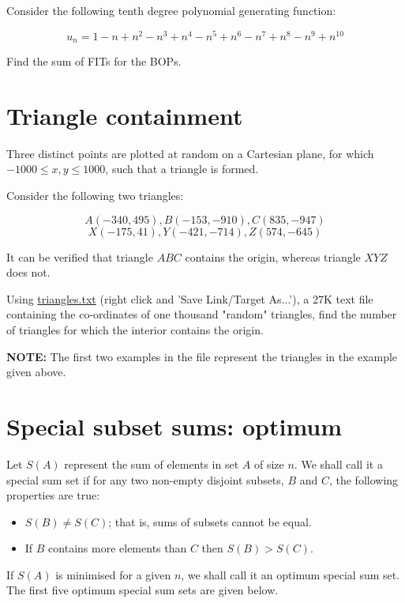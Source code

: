Consider the following tenth degree polynomial generating function:

$$u_n = 1 - n + n^2 - n^3 + n^4 - n^5 + n^6 - n^7 + n^8 - n^9 + n^{10}$$

Find the sum of FITs for the BOPs.


\section{Triangle containment} \label{pb.0102}

Three distinct points are plotted at random on a Cartesian plane, for which $-1000 \leqslant x, y \leqslant 1000$, such that a triangle is formed.

Consider the following two triangles:

$$A(-340,495), B(-153,-910), C(835,-947)$$
$$X(-175,41), Y(-421,-714), Z(574,-645)$$

It can be verified that triangle $ABC$ contains the origin, whereas triangle $XYZ$ does not.
\smallskip

Using \href{https://projecteuler.net/project/resources/p102_triangles.txt}{triangles.txt} (right click and 'Save Link/Target As...'), a 27K text file containing the co-ordinates of one thousand "random" triangles, find the number of triangles for which the interior contains the origin.
\smallskip

\textbf{NOTE:} The first two examples in the file represent the triangles in the example given above.

\newpage


\section{Special subset sums: optimum} \label{pb.0103}

Let $S(A)$ represent the sum of elements in set $A$ of size $n$. We shall call it a special sum set if for any two non-empty disjoint subsets, $B$ and $C$, the following properties are true:
\medskip

\begin{itemize}
    \item $S(B) \neq S(C)$; that is, sums of subsets cannot be equal.
    \item If $B$ contains more elements than $C$ then $S(B) > S(C)$.
\end{itemize}
\medskip

If $S(A)$ is minimised for a given $n$, we shall call it an optimum special sum set. The first five optimum special sum sets are given below.

